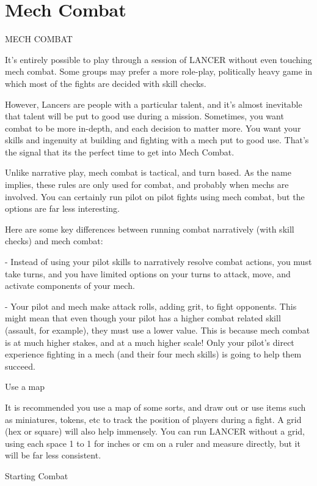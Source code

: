\part{Mech Combat}
MECH COMBAT

It’s entirely possible to play through a session of LANCER without even touching mech combat.
Some groups may prefer a more role-play, politically heavy game in which most of the fights are
decided with skill checks.


However, Lancers are people with a particular talent, and it’s almost inevitable that talent will be
put to good use during a mission. Sometimes, you want combat to be more in-depth, and each
decision to matter more. You want your skills and ingenuity at building and fighting with a mech
put to good use. That’s the signal that its the perfect time to get into Mech Combat.

Unlike narrative play, mech combat is tactical, and turn based. As the name implies, these rules
are only used for combat, and probably when mechs are involved. You can certainly run pilot on
pilot fights using mech combat, but the options are far less interesting.


Here are some key differences between running combat narratively (with skill checks) and mech
combat:

        	- Instead of using your pilot skills to narratively resolve combat actions, you must take
        turns, and you have limited options on your turns to attack, move, and activate
         components of your mech.

         - Your pilot and mech make attack rolls, adding grit, to fight opponents. This might mean
        that even though your pilot has a higher combat related skill (assault, for example), they
         must use a lower value. This is because mech combat is at much higher stakes, and at a
         much higher scale! Only your pilot’s direct experience fighting in a mech (and their four
         mech skills) is going to help them succeed.


                                                  Use a map

It is recommended you use a map of some sorts, and draw out or use items such as miniatures,
tokens, etc to track the position of players during a fight. A grid (hex or square) will also help
immensely. You can run LANCER without a grid, using each space 1 to 1 for inches or cm on a
ruler and measure directly, but it will be far less consistent.

                                              Starting Combat


